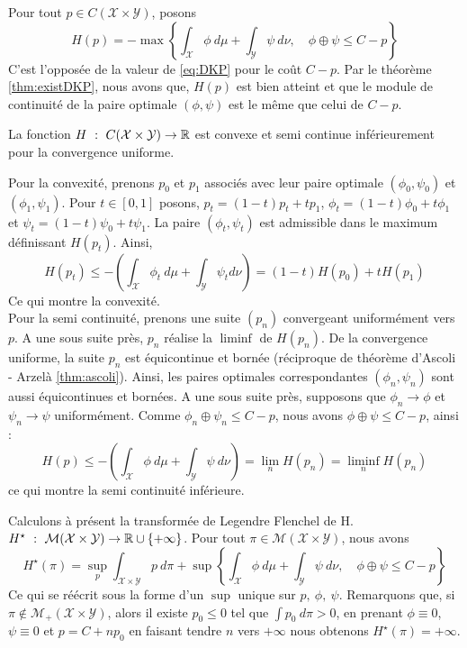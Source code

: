 \documentclass[a4paper,12pt]{article}
\begin{document}
\begin{preuve}
Pour tout $p\in C(\mathcal{X}\times\mathcal{Y})$, posons 
$$
H(p) = -\max\left\{\int_{\mathcal{X}} \phi\ d\mu +\int_{\mathcal{Y}} \psi\ d\nu, \quad \phi\oplus\psi\leq C-p\right\}
$$
C'est l'opposée de la valeur de \eqref{eq:DKP} pour le coût $C-p$. Par le théorème \ref{thm:existDKP}, nous avons que, $H(p)$ est bien atteint et que le module de continuité de la paire optimale $(\phi,\psi)$ est le même que celui de $C-p$. 
\begin{lemme}
La fonction $H\ :\ C(\mathcal{X}\times\mathcal{Y})\rightarrow\RR$ est convexe et semi continue inférieurement pour la convergence uniforme.
\end{lemme}
\begin{preuve}
Pour la convexité, prenons $p_0$ et $p_1$ associés avec leur paire optimale $(\phi_0,\psi_0)$ et $(\phi_1,\psi_1)$. Pour $t\in [0,1]$ posons, $p_t=(1-t)p_t+tp_1$, $\phi_t=(1-t)\phi_0 + t\phi_1$ et $\psi_t=(1-t)\psi_0+t\psi_1$. La paire $(\phi_t,\psi_t)$ est admissible dans le maximum définissant $H(p_t)$. Ainsi, 
$$
H(p_t)\leq-\left(\int_{\mathcal{X}}\phi_t\ d\mu+\int_{\mathcal{Y}}\psi_t d\nu\right) = (1-t)H(p_0)+tH(p_1)
$$
Ce qui montre la convexité.\\
Pour la semi continuité, prenons une suite $(p_n)$ convergeant uniformément vers $p$. A une sous suite près, $p_n$ réalise la $\liminf$ de $H(p_n)$. De la convergence uniforme, la suite $p_n$ est équicontinue et bornée (réciproque de théorème d'Ascoli - Arzelà \eqref{thm:ascoli}). Ainsi, les paires optimales correspondantes $(\phi_n,\psi_n)$ sont aussi équicontinues et bornées. A une sous suite près, supposons que $\phi_n\rightarrow\phi$ et $\psi_n\rightarrow\psi$ uniformément. Comme $\phi_n\oplus\psi_n\leq C-p$, nous avons $\phi\oplus\psi\leq C-p$, ainsi :
$$
H(p) \leq - \left(\int_{\mathcal{X}}\phi\ d\mu+\int_{\mathcal{Y}}\psi\ d\nu\right) = \lim_n H(p_n)=\liminf_n H(p_n)
$$
ce qui montre la semi continuité inférieure.
\end{preuve}
Calculons à présent la transformée de Legendre Flenchel de H.\\
$H^{\star}\ :\ \mathcal{M}(\mathcal{X}\times\mathcal{Y})\rightarrow\RR\cup\{+\infty\}$. Pour tout $\pi\in\mathcal{M}(\mathcal{X}\times\mathcal{Y})$, nous avons 
$$
H^{\star}(\pi)= \sup_p \int_{\mathcal{X}\times\mathcal{Y}} p\ d\pi + \sup \left\{ \int_{\mathcal{X}}\phi\ d\mu + \int_{\mathcal{Y}}\psi\ d\nu, \quad \phi\oplus\psi\leq C- p \right\}
$$
Ce qui se réécrit sous la forme d'un $\sup$ unique sur $p,\ \phi,\ \psi$. Remarquons que, si $\pi\notin\mathcal{M}_+(\mathcal{X}\times\mathcal{Y})$, alors il existe $p_0\leq 0$ tel que $\int p_0\ d\pi >0$, en prenant $\phi\equiv 0$, $\psi\equiv 0$ et $p=C+np_0$ en faisant tendre $n$ vers $+\infty$ nous obtenons $H^{\star}(\pi)=+\infty$.\\

\end{preuve}
\end{document}
